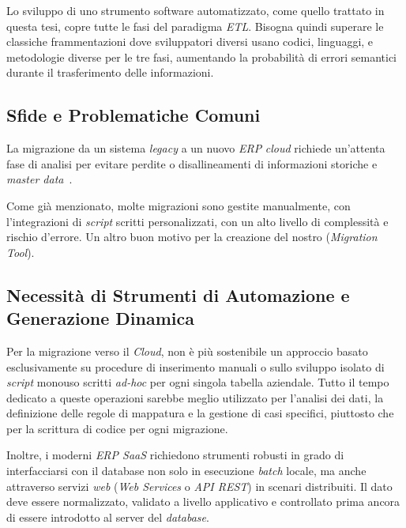 Lo sviluppo di uno strumento software automatizzato, come quello trattato in questa tesi, copre tutte le fasi del
paradigma \textit{ETL}.
Bisogna quindi superare le classiche frammentazioni dove sviluppatori diversi usano codici, linguaggi,
e metodologie diverse per le tre fasi, aumentando la probabilità di errori semantici durante il trasferimento delle informazioni.

\subsection{Sfide e Problematiche Comuni}\label{subsec:sfide-e-problematiche-comuni}
La migrazione da un sistema \textit{legacy} a un nuovo \textit{ERP} \textit{cloud} richiede un'attenta fase di analisi per evitare perdite o
disallineamenti di informazioni storiche e \textit{master data}~\cite{gali2025master}.

Come già menzionato, molte migrazioni sono gestite manualmente, con l'integrazioni di \textit{script} scritti personalizzati,
con un alto livello di complessità e rischio d'errore.
Un altro buon motivo per la creazione del nostro (\textit{Migration Tool}).

\subsection{Necessità di Strumenti di Automazione e Generazione Dinamica}\label{subsec:necessita-di-strumenti-di-automazione-e-generazione-dinamica}
Per la migrazione verso il \textit{Cloud}, non è più sostenibile un approccio basato esclusivamente su procedure di inserimento manuali 
o sullo sviluppo isolato di \textit{script} monouso scritti \textit{ad-hoc} per ogni singola tabella aziendale.
Tutto il tempo dedicato a queste operazioni sarebbe meglio utilizzato per l'analisi dei dati, la definizione delle regole di mappatura e la gestione di casi specifici,
piuttosto che per la scrittura di codice per ogni migrazione.

Inoltre, i moderni \textit{ERP SaaS} richiedono strumenti robusti in grado di interfacciarsi con il database non solo in 
esecuzione \textit{batch} locale, ma anche attraverso servizi \textit{web} (\textit{Web Services} o \textit{API REST}) in scenari distribuiti.
Il dato deve essere normalizzato, validato a livello applicativo e controllato prima ancora di essere introdotto al server del \textit{database}.

